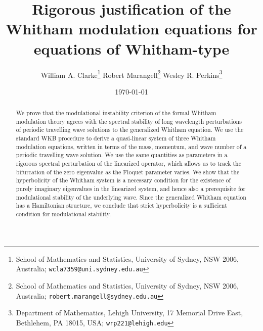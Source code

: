 \documentclass[11pt,leqno]{article}
\title{Rigorous justification of the Whitham modulation equations for equations of Whitham-type}
\author{William A. Clarke\thanks{School of Mathematics and Statistics, University of Sydney, NSW 2006, Australia; \texttt{wcla7359@uni.sydney.edu.au}}
\quad Robert Marangell\thanks{School of Mathematics and Statistics, University of Sydney, NSW 2006, Australia; \texttt{robert.marangell@sydney.edu.au}}
\quad Wesley R. Perkins\thanks{Department of Mathematics, Lehigh University, 17 Memorial Drive East, Bethlehem, PA 18015, USA; \texttt{wrp221@lehigh.edu}}
}
\date{\today}
\numberwithin{equation}{section}
\theoremstyle{definition}
\begin{document}
\maketitle








\begin{abstract} \noindent We prove that the modulational instability criterion of the formal Whitham modulation theory agrees with the spectral stability of long wavelength perturbations of periodic travelling wave solutions to the generalized Whitham equation. We use the standard WKB procedure to derive a quasi-linear system of three Whitham modulation equations, written in terms of the mass, momentum, and wave number of a periodic travelling wave solution. We use the same quantities as parameters in a rigorous spectral perturbation of the linearized operator, which allows us to track the bifurcation of the zero eigenvalue as the Floquet parameter varies. We show that the hyperbolicity of the Whitham system is a necessary condition for the existence of purely imaginary eigenvalues in the linearized system, and hence also a prerequisite for modulational stability of the underlying wave. Since the generalized Whitham equation has a Hamiltonian structure, we conclude that strict hyperbolicity is a sufficient condition for modulational stability.
\end{abstract}
\end{document}
